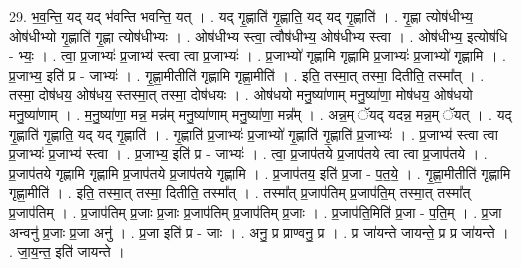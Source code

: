 \documentclass[17pt]{extarticle}
\begin{document}
29. भ॒व॒न्ति॒ यद् यद् भ॑वन्ति भवन्ति॒ यत् । . यद् गृ॒ह्णाति॑ गृ॒ह्णाति॒ यद् यद् गृ॒ह्णाति॑ । . गृ॒ह्णा त्योष॑धीभ्य॒ ओष॑धीभ्यो गृ॒ह्णाति॑ गृ॒ह्णा त्योष॑धीभ्यः । . ओष॑धीभ्य स्त्वा॒ त्वौष॑धीभ्य॒ ओष॑धीभ्य स्त्वा । . ओष॑धीभ्य॒ इत्योष॑धि - भ्यः॒ । . त्वा॒ प्र॒जाभ्यः॑ प्र॒जाभ्य॑ स्त्वा त्वा प्र॒जाभ्यः॑ । . प्र॒जाभ्यो॑ गृह्णामि गृह्णामि प्र॒जाभ्यः॑ प्र॒जाभ्यो॑ गृह्णामि । . प्र॒जाभ्य॒ इति॑ प्र - जाभ्यः॑ । . गृ॒ह्णा॒मीतीति॑ गृह्णामि गृह्णा॒मीति॑ । . इति॒ तस्मा॒त् तस्मा॒ दितीति॒ तस्मा᳚त् । . तस्मा॒ दोष॑धय॒ ओष॑धय॒ स्तस्मा॒त् तस्मा॒ दोष॑धयः । . ओष॑धयो मनु॒ष्या॑णाम् मनु॒ष्या॑णा॒ मोष॑धय॒ ओष॑धयो मनु॒ष्या॑णाम् । . म॒नु॒ष्या॑णा॒ मन्न॒ मन्न॑म् मनु॒ष्या॑णाम् मनु॒ष्या॑णा॒ मन्न᳚म् । . अन्न॒म् ॅयद् यदन्न॒ मन्न॒म् ॅयत् । . यद् गृ॒ह्णाति॑ गृ॒ह्णाति॒ यद् यद् गृ॒ह्णाति॑ । . गृ॒ह्णाति॑ प्र॒जाभ्यः॑ प्र॒जाभ्यो॑ गृ॒ह्णाति॑ गृ॒ह्णाति॑ प्र॒जाभ्यः॑ । . प्र॒जाभ्य॑ स्त्वा त्वा प्र॒जाभ्यः॑ प्र॒जाभ्य॑ स्त्वा । . प्र॒जाभ्य॒ इति॑ प्र - जाभ्यः॑ । . त्वा॒ प्र॒जाप॑तये प्र॒जाप॑तये त्वा त्वा प्र॒जाप॑तये । . प्र॒जाप॑तये गृह्णामि गृह्णामि प्र॒जाप॑तये प्र॒जाप॑तये गृह्णामि । . प्र॒जाप॑तय॒ इति॑ प्र॒जा - प॒त॒ये॒ । . गृ॒ह्णा॒मीतीति॑ गृह्णामि गृह्णा॒मीति॑ । . इति॒ तस्मा॒त् तस्मा॒ दितीति॒ तस्मा᳚त् । . तस्मा᳚त् प्र॒जाप॑तिम् प्र॒जाप॑ति॒म् तस्मा॒त् तस्मा᳚त् प्र॒जाप॑तिम् । . प्र॒जाप॑तिम् प्र॒जाः प्र॒जाः प्र॒जाप॑तिम् प्र॒जाप॑तिम् प्र॒जाः । . प्र॒जाप॑ति॒मिति॑ प्र॒जा - प॒ति॒म् । . प्र॒जा अन्वनु॑ प्र॒जाः प्र॒जा अनु॑ । . प्र॒जा इति॑ प्र - जाः । . अनु॒ प्र प्राण्वनु॒ प्र । . प्र जा॑यन्ते जायन्ते॒ प्र प्र जा॑यन्ते । . जा॒य॒न्त॒ इति॑ जायन्ते । \newline
\end{document}
